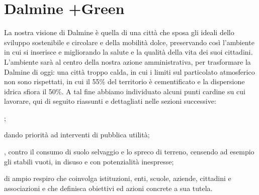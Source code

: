 \chapter{Dalmine +Green}
La nostra visione di Dalmine è quella di una città che sposa gli ideali dello sviluppo sostenibile e circolare e della mobilità dolce, preservando così l'ambiente in cui si inserisce e migliorando la salute e la qualità della vita dei suoi cittadini. L'ambiente sarà al centro della nostra azione amministrativa, per trasformare la Dalmine di oggi: una città troppo calda, in cui i limiti sul particolato atmosferico non sono rispettati, in cui il 55\% del territorio è cementificato e la dispersione idrica sfiora il 50\%. A tal fine abbiamo individuato alcuni punti cardine su cui lavorare, qui di seguito riassunti e dettagliati nelle sezioni successive:

;

 dando priorità ad interventi di pubblica utilità;

, contro il consumo di suolo selvaggio e lo spreco di terreno, censendo ad esempio gli stabili vuoti, in disuso e con potenzialità inespresse;

 di ampio respiro che coinvolga istituzioni, enti, scuole, aziende, cittadini e associazioni e che definisca obiettivi ed azioni concrete a sua tutela.







